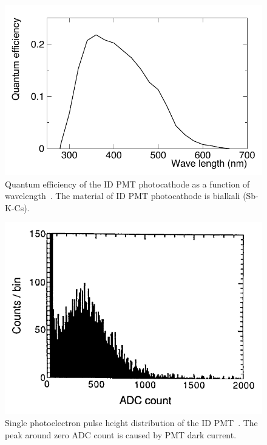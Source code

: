 \begin{figure}[tbp]
	\centering
	\includegraphics[width=12cm]{Figures/002/F04_IDPMTQE}
	\caption[Quantum efficiency of the ID PMT photocathode as a function of wavelength]{\label{002_F04_IDPMTQE} Quantum efficiency of the ID PMT photocathode as a function of wavelength~\cite{2003Fukuda}. The material of ID PMT photocathode is bialkali (Sb-K-Cs).}
\end{figure}

\begin{figure}[tbp]
	\centering
	\includegraphics[width=12cm]{Figures/002/F05_IDPMT1pe}
	\caption[Single photoelectron pulse height distribution of the ID PMT]{\label{002_F05_IDPMT1pe} Single photoelectron pulse height distribution of the ID PMT~\cite{2003Fukuda}. The peak around zero ADC count is caused by PMT dark current.}
\end{figure}

